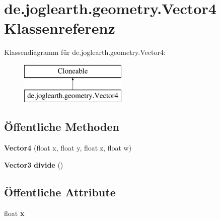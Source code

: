 \section{de.\-joglearth.\-geometry.\-Vector4 Klassenreferenz}
\label{classde_1_1joglearth_1_1geometry_1_1_vector4}
Klassendiagramm für de.\-joglearth.\-geometry.\-Vector4\-:\begin{figure}[H]
\begin{center}
\leavevmode
\includegraphics[height=2.000000cm]{classde_1_1joglearth_1_1geometry_1_1_vector4}
\end{center}
\end{figure}
\subsection*{Öffentliche Methoden}
\begin{DoxyCompactItemize}
\item 
{\bfseries Vector4} (float x, float y, float z, float w)\label{classde_1_1joglearth_1_1geometry_1_1_vector4_a70db9638f6e7aa161eea017b1b795af9}

\item 
{\bf Vector3} {\bfseries divide} ()\label{classde_1_1joglearth_1_1geometry_1_1_vector4_a9c46bb2498e82e0b2a28a8bad0406bb1}

\end{DoxyCompactItemize}
\subsection*{Öffentliche Attribute}
\begin{DoxyCompactItemize}
\item 
float {\bfseries x}\label{classde_1_1joglearth_1_1geometry_1_1_vector4_a1b56f77e0d2e295f9fd3259705107c7c}

\end{DoxyCompactItemize}

